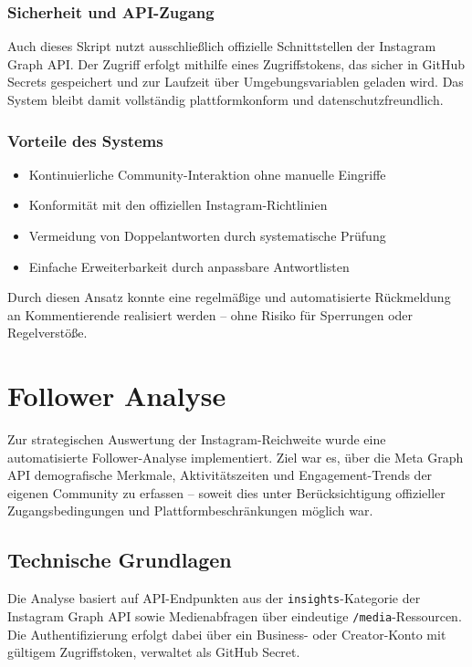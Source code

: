 \documentclass[a4paper,12pt]{article}
\begin{document}
\subsubsection*{Sicherheit und API-Zugang}

Auch dieses Skript nutzt ausschließlich offizielle Schnittstellen der Instagram Graph API. Der Zugriff erfolgt mithilfe eines Zugriffstokens, das sicher in GitHub Secrets gespeichert und zur Laufzeit über Umgebungsvariablen geladen wird. Das System bleibt damit vollständig plattformkonform und datenschutzfreundlich.

\subsubsection*{Vorteile des Systems}

\begin{itemize}
    \item Kontinuierliche Community-Interaktion ohne manuelle Eingriffe
    \item Konformität mit den offiziellen Instagram-Richtlinien
    \item Vermeidung von Doppelantworten durch systematische Prüfung
    \item Einfache Erweiterbarkeit durch anpassbare Antwortlisten
\end{itemize}

Durch diesen Ansatz konnte eine regelmäßige und automatisierte Rückmeldung an Kommentierende realisiert werden – ohne Risiko für Sperrungen oder Regelverstöße.


\section{Follower Analyse}

Zur strategischen Auswertung der Instagram-Reichweite wurde eine automatisierte Follower-Analyse implementiert. Ziel war es, über die Meta Graph API demografische Merkmale, Aktivitätszeiten und Engagement-Trends der eigenen Community zu erfassen – soweit dies unter Berücksichtigung offizieller Zugangsbedingungen und Plattformbeschränkungen möglich war.

\subsection{Technische Grundlagen}

Die Analyse basiert auf API-Endpunkten aus der \texttt{insights}-Kategorie der Instagram Graph API sowie Medienabfragen über eindeutige \texttt{/media}-Ressourcen. Die Authentifizierung erfolgt dabei über ein Business- oder Creator-Konto mit gültigem Zugriffstoken, verwaltet als GitHub Secret.
\end{document}
